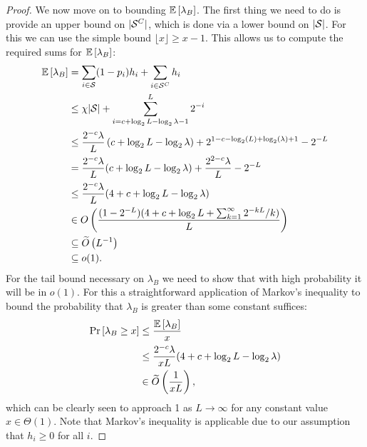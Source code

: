 \begin{proof}
We now move on to bounding $\mathbb{E}\left[ \lambda_B \right]$. The first thing we need to do is provide an upper bound on $|\mathcal{S}^C|$, which is done via a lower bound on $|\mathcal{S}|$. For this we can use the simple bound $\lfloor x \rfloor \geq x - 1$. This allows us to compute the required sums for $\mathbb{E}\left[ \lambda_B \right]$:
\begin{align}
    \mathbb{E}\left[ \lambda_B \right] &= \sum_{i \in \mathcal{S}} (1-p_i) h_i + \sum_{i \in \mathcal{S}^C} h_i \\
    &\leq \chi |\mathcal{S}| + \sum_{i = c + \log_2 L - \log_2 \lambda - 1}^L 2^{-i} \\
    &\leq \frac{2^{-c} \lambda}{L} \left( c + \log_2 L - \log_2 \lambda \right) + 2^{1 - c - \log_2(L) + \log_2 (\lambda) + 1} - 2^{-L} \\
    &= \frac{2^{-c} \lambda}{L}(c + \log_2 L - \log_2 \lambda) + \frac{2^{2 - c} \lambda}{L} - 2^{-L} \\
    &\leq \frac{2^{-c} \lambda}{L}(4 + c + \log_2 L - \log_2 \lambda) \\
    &\in O\left( \frac{(1 - 2^{-L})(4 + c + \log_2 L + \sum_{k=1}^{\infty} 2^{-kL}/k )}{L} \right) \\
    &\subseteq \widetilde{O} \left( L^{-1} \right) \\
    &\subseteq o(1).
\end{align}
For the tail bound necessary on $\lambda_B$ we need to show that with high probability it will be in $o(1)$. For this a straightforward application of Markov's inequality to bound the probability that $\lambda_B$ is greater than some constant suffices:
\begin{align}
    \text{Pr}\left[ \lambda_B \geq x \right] &\leq \frac{\mathbb{E}\left[ \lambda_B \right]}{x} \\
    &\leq \frac{2^{-c} \lambda }{x L} (4 + c + \log_2 L -\log_2 \lambda) \\ 
    &\in \widetilde{O} \left( \frac{1}{x L} \right),
\end{align}
which can be clearly seen to approach 1 as $L \to \infty$ for any constant value $x \in \Theta(1)$. Note that Markov's inequality is applicable due to our assumption that $h_i \geq 0$ for all $i$.


\end{proof}
